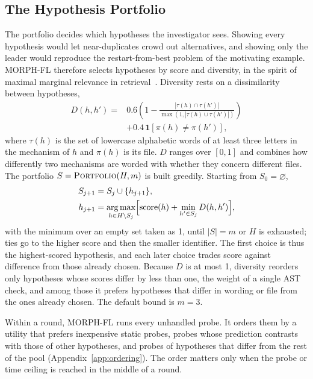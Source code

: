 \documentclass[a4paper,fleqn]{cas-sc}
\newcommand{\tool}{MORPH-FL}
\begin{document}
\subsection{The Hypothesis Portfolio}\label{sec:portfolio}
The portfolio decides which hypotheses the investigator sees. Showing every hypothesis would let near-duplicates crowd out alternatives, and showing only the leader would reproduce the restart-from-best problem of the motivating example. \tool{} therefore selects hypotheses by score and diversity, in the spirit of maximal marginal relevance in retrieval~\citep{mmr1998}. Diversity rests on a dissimilarity between hypotheses,
\begin{equation}\label{eq:distance}
\begin{aligned}
D(h,h')={}&0.6\left(1-\frac{|\tau(h)\cap\tau(h')|}{\max(1,|\tau(h)\cup\tau(h')|)}\right)\\
&+0.4\,\mathbf{1}[\pi(h)\neq\pi(h')],
\end{aligned}
\end{equation}
where $\tau(h)$ is the set of lowercase alphabetic words of at least three letters in the mechanism of $h$ and $\pi(h)$ is its file. $D$ ranges over $[0,1]$ and combines how differently two mechanisms are worded with whether they concern different files. The portfolio $S=\textsc{Portfolio}(H,m)$ is built greedily. Starting from $S_0=\varnothing$,
\begin{equation}\label{eq:portfolio}
\begin{aligned}
S_{j+1}&=S_j\cup\{h_{j+1}\},\\
h_{j+1}&=\operatorname*{arg\,max}_{h\in H\setminus S_j}\Bigl[\mathrm{score}(h)+\min_{h'\in S_j}D(h,h')\Bigr],
\end{aligned}
\end{equation}
with the minimum over an empty set taken as 1, until $|S|=m$ or $H$ is exhausted; ties go to the higher score and then the smaller identifier. The first choice is thus the highest-scored hypothesis, and each later choice trades score against difference from those already chosen. Because $D$ is at most 1, diversity reorders only hypotheses whose scores differ by less than one, the weight of a single AST check, and among those it prefers hypotheses that differ in wording or file from the ones already chosen. The default bound is $m=3$.

Within a round, \tool{} runs every unhandled probe. It orders them by a utility that prefers inexpensive static probes, probes whose prediction contrasts with those of other hypotheses, and probes of hypotheses that differ from the rest of the pool (Appendix~\ref{app:ordering}). The order matters only when the probe or time ceiling is reached in the middle of a round.
\end{document}
